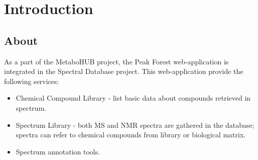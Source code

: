 


\usepackage{hyperref}












\section{Introduction}
\subsection{About}
As a part of the MetaboHUB project, the Peak Forest web-application is integrated in the Spectral Database project. 
This web-application provide the following services:
\begin{itemize}
	\item Chemical Compound Library - list basic data about compounds retrieved in spectrum.
	\item Spectrum Library - both MS and NMR spectra are gathered in the database; spectra can refer to chemical compounds from library or biological matrix.
	\item Spectrum annotation tools.
\end{itemize} 


